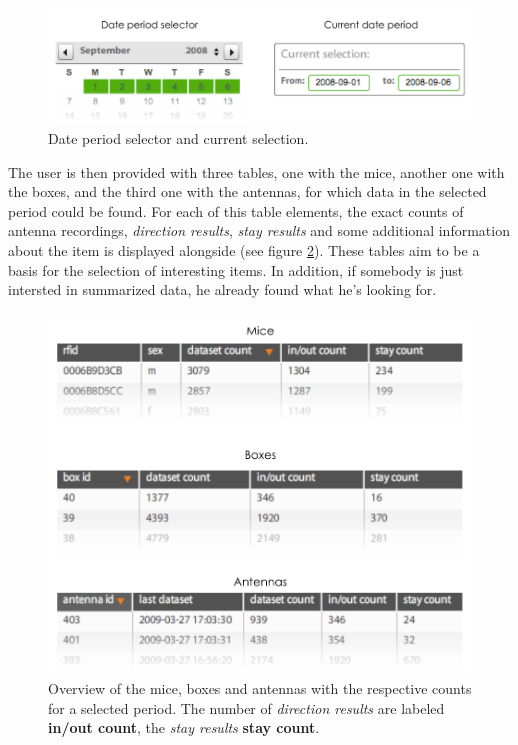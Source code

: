 \begin{figure}[htpb]
\begin{center}
  \includegraphics[width=.75\textwidth]{assets/pdf/date_period.pdf}
  \caption[Date period selection]{Date period selector and current selection.}
  \label{fig:date_period}
\end{center}
\end{figure}

The user is then provided with three tables, one with the mice, another one with the boxes, and the third one with the antennas, for which data in the selected period could be found. For each of this table elements, the exact counts of antenna recordings, \textit{direction results}, \textit{stay results} and some additional information about the item is displayed alongside (see figure \ref{fig:data_overview_with_count}). These tables aim to be a basis for the selection of interesting items. In addition, if somebody is just intersted in summarized data, he already found what he's looking for. 

\begin{figure}[htpb]
\begin{center}
  \includegraphics[width=.66\textwidth]{assets/pdf/overview_list.pdf}
  \caption[Overview of the summarized data for mice, boxes and antennas within a date period]{Overview of the mice, boxes and antennas with the respective counts for a selected period. The number of \textit{direction results} are labeled \textbf{in/out count}, the \textit{stay results}  \textbf{stay count}.}
  \label{fig:data_overview_with_count}
\end{center}
\end{figure}

